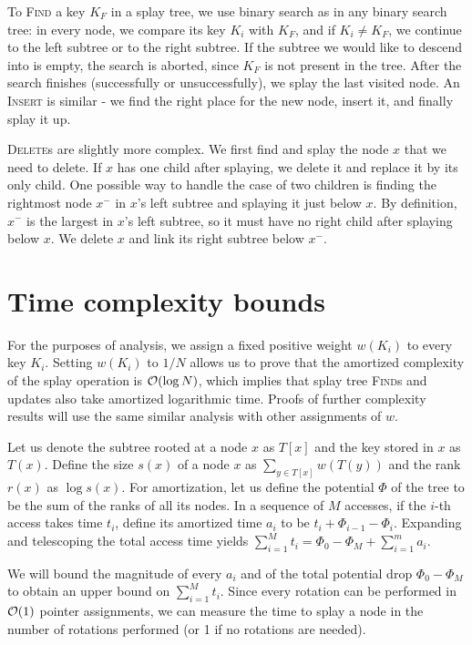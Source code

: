 
To \textsc{Find} a key $K_F$ in a splay tree, we use binary search as in any
binary search tree: in every node, we compare its key $K_i$ with $K_F$, and
if $K_i \neq K_F$, we continue to the left subtree or to the right subtree.
If the subtree we would like to descend into is empty, the search is aborted,
since $K_F$ is not present in the tree.
After the search finishes (successfully or unsuccessfully), we splay the last
visited node. An \textsc{Insert} is similar - we find the right place for the
new node, insert it, and finally splay it up.

\textsc{Delete}s are slightly more complex. We first find and splay the node $x$
that we need to delete. If $x$ has one child after splaying, we delete it and
replace it by its only child. One possible way to handle the case of two
children is finding the rightmost node $x^-$ in $x$'s left subtree and splaying
it just below $x$. By definition, $x^-$ is the largest in $x$'s left subtree,
so it must have no right child after splaying below $x$. We delete $x$ and link
its right subtree below $x^-$.

\section{Time complexity bounds}
For the purposes of analysis, we assign a fixed positive weight $w(K_i)$
to every key $K_i$. Setting $w(K_i)$ to $1/N$ allows us to prove that
the amortized complexity of the splay operation is $\mathcal{O}(\log N)$, which implies
that splay tree \textsc{Find}s and updates also take amortized logarithmic time.
Proofs of further complexity results will use the same similar analysis with
other assignments of $w$.

Let us denote the subtree rooted at a node $x$ as $T[x]$
and the key stored in $x$ as $T(x)$. Define the size $s(x)$ of a node $x$ as
$\sum_{y\in T[x]} w(T(y))$ and the rank $r(x)$ as $\log s(x)$.
For amortization, let us define the potential $\Phi$ of the tree to be the sum
of the ranks of all its nodes. In a sequence of $M$ accesses, if the $i$-th
access takes time $t_i$, define its amortized time $a_i$ to be
$t_i+\Phi_{i-1}-\Phi_{i}$. Expanding and telescoping the total access time
yields $\sum_{i=1}^M t_i=\Phi_0-\Phi_M+\sum_{i=1}^m a_i$.

We will bound the magnitude of every $a_i$ and of the total potential drop
$\Phi_0-\Phi_M$ to obtain an upper bound on $\sum_{i=1}^M t_i$.
Since every rotation can be performed in $\mathcal{O}(1)$
pointer assignments, we can measure the time to splay a node in the number
of rotations performed (or 1 if no rotations are needed).

